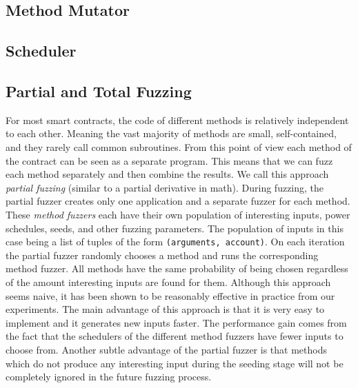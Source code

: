 \subsection*{Method Mutator}


\subsection*{Scheduler}

\subsection*{Partial and Total Fuzzing}
For most smart contracts, the code of different methods is relatively independent to each other.
Meaning the vast majority of methods are small, self-contained, and they rarely call common subroutines.
From this point of view each method of the contract can be seen as a separate program.
This means that we can fuzz each method separately and then combine the results.
We call this approach \textit{partial fuzzing} (similar to a partial derivative in math).
During fuzzing, the partial fuzzer creates only one application and a separate fuzzer for each method.
These \textit{method fuzzers} each have their own population of interesting inputs, power schedules, seeds, and other fuzzing parameters.
The population of inputs in this case being a list of tuples of the form \texttt{(arguments, account)}.
On each iteration the partial fuzzer randomly chooses a method and runs the corresponding method fuzzer.
All methods have the same probability of being chosen regardless of the amount interesting inputs are found for them.
Although this approach seems naive, it has been shown to be reasonably effective in practice from our experiments.
The main advantage of this approach is that it is very easy to implement and it generates new inputs faster.
The performance gain comes from the fact that the schedulers of the different method fuzzers have fewer inputs to choose from.
Another subtle advantage of the partial fuzzer is that methods which do not produce any interesting input during the seeding stage will not be completely ignored in the future fuzzing process.

